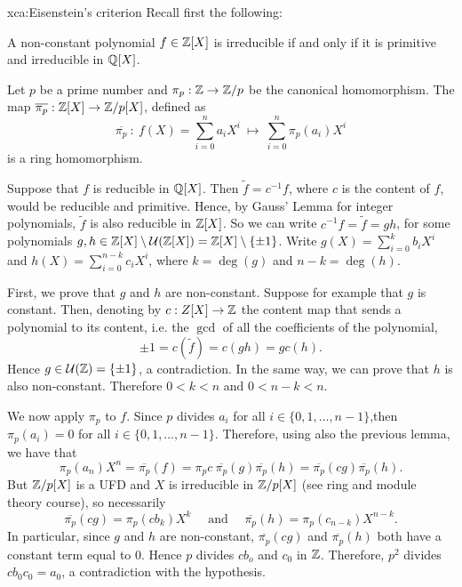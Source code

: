 \begin{sol}{xca:Eisenstein's criterion}
Recall first the following:
\begin{lemma*}
\label{Gauss lem}
A non-constant polynomial $f\in \mathbb{Z}[X]$ is irreducible if and only if it is primitive and irreducible in $\mathbb{Q}[X]$.
\end{lemma*}
\begin{lemma*}
\label{mod p is a hom}
   Let $p$ be a prime number and $\pi_p:\mathbb{Z}\to\mathbb{Z}/p$
   be the canonical homomorphism. 
    The map $\overline{\pi_p}:\mathbb{Z}[X]\to \mathbb{Z}/p[X]$, defined as 
    \[
    \overline{\pi_p} ~:~ f(X)=\sum_{i=0}^na_iX^i~\longmapsto~\sum_{i=0}^n\pi_p(a_i)X^i
    \]
    is a ring homomorphism.
\end{lemma*}

    Suppose that $f$ is reducible in $\mathbb{Q}[X]$.
    Then $\widetilde{f}=c^{-1}f$, where $c$ is the content of $f$,
    would be reducible and primitive.
    Hence, by Gauss' Lemma for integer polynomials, $\widetilde{f}$ is also 
    reducible in $\mathbb{Z}[X]$.
    So we can write $c^{-1}f=\widetilde{f}=gh$, for some 
    polynomials $g,h\in \mathbb{Z}[X]\setminus\mathcal{U}(\mathbb{Z}[X])=\mathbb{Z}[X]\setminus\{\pm1\}$.
    Write $g(X)=\sum_{i=0}^k b_iX^i$ and $h(X)=\sum_{i=0}^{n-k} c_iX^i$, where $k=\deg(g)$ and $n-k=\deg(h)$.
    
    First, we prove that $g$ and $h$ are non-constant.
    Suppose for example that $g$ is constant.
    Then, denoting by $c:Z[X]\to \mathbb{Z}$ the content map that sends a polynomial to its content, i.e. the $\gcd$ of all the coefficients of the polynomial,
    \[
    \pm 1=c(\widetilde{f})=c(gh)=gc(h).
    \]
    Hence $g\in \mathcal{U}(\mathbb{Z})=\{\pm1\}$, a contradiction. In the same way, we can prove that $h$ is also non-constant.
    Therefore $0<k<n$ and $0<n-k<n$.
    
    We now apply $\pi_p$ to $f$.
    Since $p$ divides $a_i$ for all 
    $i\in\{0,1,\dots, n-1\}$,then $\pi_p(a_i)=0$ for all 
    $i\in\{0,1,\dots, n-1\}$.
    Therefore, using also the previous lemma, we have that 
    \[
    \pi_p(a_n)X^n=\overline{\pi_p}(f)=\pi_p{c}\:\overline{\pi_p}(g)\overline{\pi_p}(h)=
    \overline{\pi_p}(cg)\overline{\pi_p}(h).
    \]
    But $\mathbb{Z}/p[X]$ is a UFD and $X$ is irreducible in $\mathbb{Z}/p[X]$ (see ring and module theory course), so necessarily
    \[
    \overline{\pi_p}(cg)=\pi_p(cb_k)X^k \quad\text{ and }\quad\overline{\pi_p}(h)=\pi_p(c_{n-k})X^{n-k}.
    \]
    In particular, since $g$ and $h$ are non-constant, $\overline{\pi_p}(cg)$ and $\overline{\pi_p}(h)$ both have a constant term equal to 0.
    Hence $p$ divides $cb_o$ and $c_0$ in $\mathbb{Z}$.
    Therefore, $p^2$ divides $cb_0c_0=a_0$,
    a contradiction with the hypothesis.
\end{sol}

